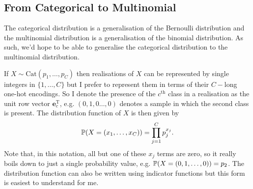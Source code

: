 \documentclass[11pt]{article}
\begin{document}
\begin{appendices}
\subsection{From Categorical to Multinomial}
The categorical distribution is a generalisation of the Bernoulli distribution and the multinomial distribution is a generalisation of the binomial distribution. As such, we'd hope to be able to generalise the categorical distribution to the multinomial distribution.

If $X\sim\text{Cat}(p_1,\dots,p_C)$ then realisations of $X$ can be represented by single integers in $\{1,\dots,C\}$ but I prefer to represent them in terms of their $C-$long one-hot encodings. So I denote the presence of the $c^{\text{th}}$ class in a realisation as the unit row vector $\mathbf{e}_c^{\text{T}}$, e.g. $(0,1,0\dots,0)$ denotes a sample in which the second class is present. The distribution function of $X$ is then given by
$$
\P(X=(x_1,\dots,x_C))
=
\prod_{j=1}^Cp_j^{x_j}.
$$
Note that, in this notation, all but one of these $x_j$ terms are zero, so it really boils down to just a single probability value, e.g. $\P(X=(0,1,\dots,0))=p_2$. The distribution function can also be written using indicator functions but this form is easiest to understand for me.


\end{appendices}
\end{document}
